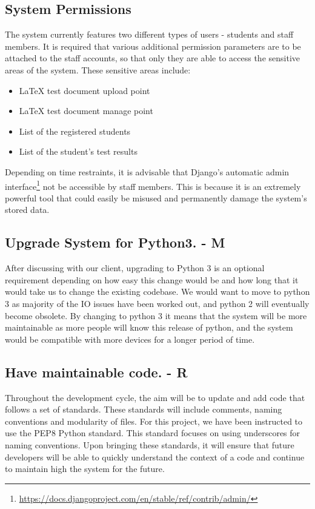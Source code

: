\documentclass[12pt]{article}
\begin{document}
	\subsection{System Permissions}
	The system currently features two different types of users - students and staff members. It is required that various additional permission parameters are to be attached to the staff accounts, so that only they are able to access the sensitive areas of the system. These sensitive areas include:
	\begin{itemize}  
        \item LaTeX test document upload point
        \item LaTeX test document manage point
        \item List of the registered students
        \item List of the student's test results
    \end{itemize}
    Depending on time restraints, it is advisable that Django's automatic admin interface\footnote{\url{https://docs.djangoproject.com/en/stable/ref/contrib/admin/}} not be accessible by staff members. This is because it is an extremely powerful tool that could easily be misused and permanently damage the system's stored data.

	\subsection{Upgrade System for Python3. - M}
	After discussing with our client, upgrading to Python 3 is an optional requirement depending on how easy this change would be and how long that it would take us to change the existing codebase. 
We would want to move to python 3 as majority of the IO issues have been worked out, and python 2 will eventually become obsolete. By changing to python 3 it means that the system will be more maintainable as more people will know this release of python, and the system would be compatible with more devices for a longer period of time.

	\subsection{Have maintainable code. - R}
	Throughout the development cycle, the aim will be to update and add code that follows a set of standards. These standards will include comments, naming conventions and modularity of files. For this project, we have been instructed to use the PEP8 Python standard. This standard focuses on using underscores for naming conventions. Upon bringing these standards, it will ensure that future developers will be able to quickly understand the context of a code and continue to maintain high the system for the future.
\end{document}
